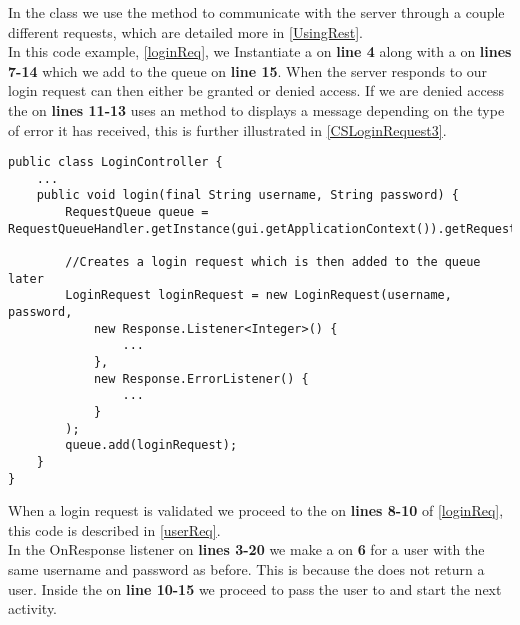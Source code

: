 In the  class we use the  method to
communicate with the server through a couple different requests, which are
detailed more in \autoref{UsingRest}.\\

In this code example, \autoref{loginReq}, we Instantiate a 
on \textbf{line 4} along with a  on \textbf{lines 7-14}
which we add to the queue on \textbf{line 15}. When the server responds to our
login request can then either be granted or denied access. If we are denied
access the  on \textbf{lines 11-13} uses an
 method to displays a message depending on the type of
error it has received, this is further illustrated in
\autoref{CSLoginRequest3}.\nl

\begin{minipage}[H]{\linewidth}
\begin{lstlisting}[caption = Verifing the user information through a login
request, label = loginReq] public class LoginController {
	...
    public void login(final String username, String password) {
        RequestQueue queue = RequestQueueHandler.getInstance(gui.getApplicationContext()).getRequestQueue();

        //Creates a login request which is then added to the queue later
        LoginRequest loginRequest = new LoginRequest(username, password,
        	new Response.Listener<Integer>() {
        		...
        	},
        	new Response.ErrorListener() {
        		...
        	}
   		);
		queue.add(loginRequest);
	}
}
\end{lstlisting}
\end{minipage}

When a login request is validated we proceed to the  on
\textbf{lines 8-10} of \autoref{loginReq}, this code is described in
\autoref{userReq}.\\
In the OnResponse listener on \textbf{lines 3-20} we make a 
on \textbf{6} for a user with the same username and password as before. This is
because the  does not return a user. Inside the
 on \textbf{line 10-15} we proceed to pass the user
to  and start the next activity.\nl

